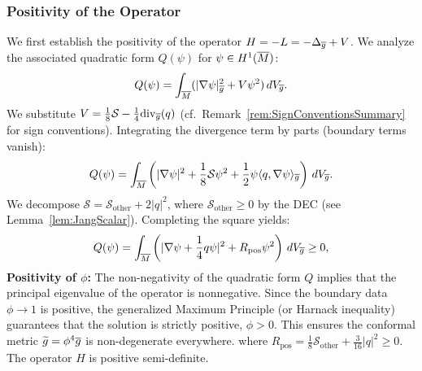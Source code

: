 \subsubsection{Positivity of the Operator}
We first establish the positivity of the operator $H=-L = -\Delta_{\overline{g}} + V$. We analyze the associated quadratic form $Q(\psi)$ for $\psi \in H^1(\overline{M})$:
\[ Q(\psi) = \int_{\overline{M}} (|\nabla \psi|^2_{\overline{g}} + V \psi^2) \, dV_{\overline{g}}. \]
We substitute $V = \frac{1}{8}\mathcal{S} - \frac{1}{4}\mathrm{div}_{\overline{g}}(q)$ (cf.\ Remark~\ref{rem:SignConventionsSummary} for sign conventions). Integrating the divergence term by parts (boundary terms vanish):
\[ Q(\psi) = \int_{\overline{M}} \left(|\nabla \psi|^2 + \frac{1}{8}\mathcal{S}\psi^2 + \frac{1}{2} \psi \langle q, \nabla\psi \rangle_{\overline{g}}\right) \, dV_{\overline{g}}. \]
We decompose $\mathcal{S} = \mathcal{S}_{\text{other}} + 2|q|^2$, where $\mathcal{S}_{\text{other}} \ge 0$ by the DEC (see Lemma~\ref{lem:JangScalar}). Completing the square yields:
\begin{equation}\label{eq:Q_Positive}
    Q(\psi) = \int_{\overline{M}} \left( |\nabla \psi + \frac{1}{4}q\psi|^2 + R_{\text{pos}}\psi^2 \right) \, dV_{\overline{g}} \ge 0,
\end{equation}
\textbf{Positivity of $\phi$:} The non-negativity of the quadratic form $Q$ implies that the principal eigenvalue of the operator is nonnegative. Since the boundary data $\phi \to 1$ is positive, the generalized Maximum Principle (or Harnack inequality) guarantees that the solution is strictly positive, $\phi > 0$. This ensures the conformal metric $\widetilde{g} = \phi^4 \overline{g}$ is non-degenerate everywhere.
where $R_{\text{pos}} = \frac{1}{8}\mathcal{S}_{\text{other}} + \frac{3}{16}|q|^2 \ge 0$. The operator $H$ is positive semi-definite.

